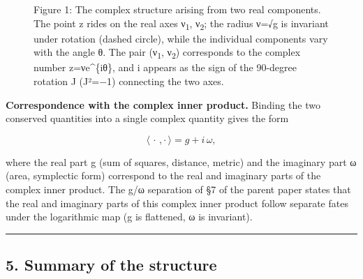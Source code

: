 \documentclass[11pt]{ltjsarticle}
\providecommand{\pandocbounded}[1]{#1}
\begin{document}
\begin{figure}
\centering
\pandocbounded{}
\caption{Figure 1: The complex structure arising from two real
components. The point z rides on the real axes ν\textsubscript{1}, ν\textsubscript{2}; the radius ν=√g
is invariant under rotation (dashed circle), while the individual
components vary with the angle θ. The pair (ν\textsubscript{1}, ν\textsubscript{2}) corresponds to the
complex number z=νe\^{}\{iθ\}, and i appears as the sign of the
90-degree rotation J (J²=−1) connecting the two axes.}
\end{figure}

\textbf{Correspondence with the complex inner product.} Binding the two
conserved quantities into a single complex quantity gives the form

\[\langle\,\cdot\,,\cdot\,\rangle = g + i\,\omega,\]

where the real part g (sum of squares, distance, metric) and the
imaginary part ω (area, symplectic form) correspond to the real and
imaginary parts of the complex inner product. The g/ω separation of §7
of the parent paper states that the real and imaginary parts of this
complex inner product follow separate fates under the logarithmic map (g
is flattened, ω is invariant).

\begin{center}\rule{0.5\linewidth}{0.5pt}\end{center}

\subsection{5. Summary of the structure}\label{summary-of-the-structure}
\end{document}

